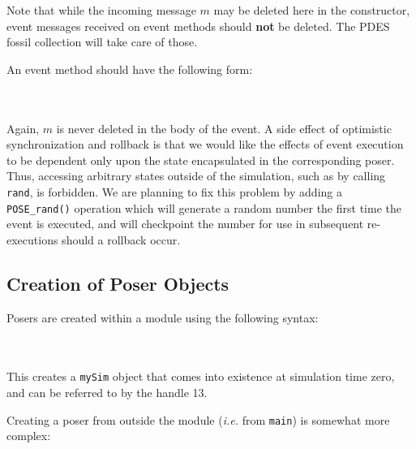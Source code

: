 Note that while the incoming message $m$ may be deleted here in the
constructor, event messages received on event methods should {\bf not} be
deleted.  The PDES fossil collection will take care of those.

An event method should have the following form:

~\\
\\

Again, $m$ is never deleted in the body of the event.  A side effect
of optimistic synchronization and rollback is that we would like the
effects of event execution to be dependent only upon the state
encapsulated in the corresponding poser.  Thus, accessing arbitrary
states outside of the simulation, such as by calling {\tt rand}, is
forbidden.  We are planning to fix this problem by adding a {\tt
  POSE\_rand()} operation which will generate a random number the first
time the event is executed, and will checkpoint the number for use in
subsequent re-executions should a rollback occur.

\subsection{Creation of Poser Objects}

Posers are created within a module using the following syntax:

~\\
\\

This creates a {\tt mySim} object that comes into existence at
simulation time zero, and can be referred to by the handle 13.  

Creating a poser from outside the module ({\it i.e.} from {\tt main})
is somewhat more complex:

~\\
\\

